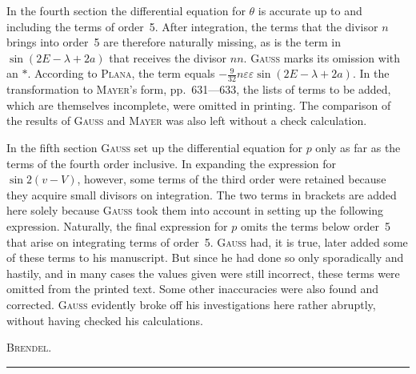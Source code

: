 \par\noindent\hspace*{\parindent}In the fourth section the differential equation for \(\theta\) is accurate up to and including the terms of order~5.
After integration, the terms that the divisor \(n\) brings into
order~5 are therefore naturally missing, as is the term in \(\sin(2E-\lambda+2a)\) that receives the divisor \(nn\).
\textsc{Gauss} marks its omission with an \(*\). According to \textsc{Plana}, the term equals \(-\frac{9}{32}n\varepsilon\varepsilon\sin(2E-\lambda+2a)\).
In the transformation to \textsc{Mayer}’s form, pp.~631---633, the lists of terms to be added,
which are themselves incomplete, were omitted in printing. The comparison of the results of
\textsc{Gauss} and \textsc{Mayer} was also left without a check calculation.

\par\noindent\hspace*{\parindent}In the fifth section \textsc{Gauss} set up the differential equation for \(p\) only as far as the terms of the fourth order
inclusive. In expanding the expression for \(\sin 2(v-V)\), however, some
terms of the third order were retained because they acquire small divisors on integration. The two
terms in brackets are added here solely because \textsc{Gauss} took them into account in setting up the
following expression. Naturally, the final expression for \(p\) omits
the terms below order~5 that arise on integrating terms of order~5.
\textsc{Gauss} had, it is true, later added some of these terms to his manuscript. But
since he had done so only sporadically and hastily, and in many cases the values given were still incorrect,
these terms were omitted from the printed text. Some other inaccuracies were also found
and corrected. \textsc{Gauss} evidently broke off his investigations here rather abruptly,
without having checked his calculations.
\begin{flushright}\textsc{Brendel}.\end{flushright}
\par\begin{center}\rule{.24\linewidth}{.4pt}\end{center}
\clearpage
\endgroup
